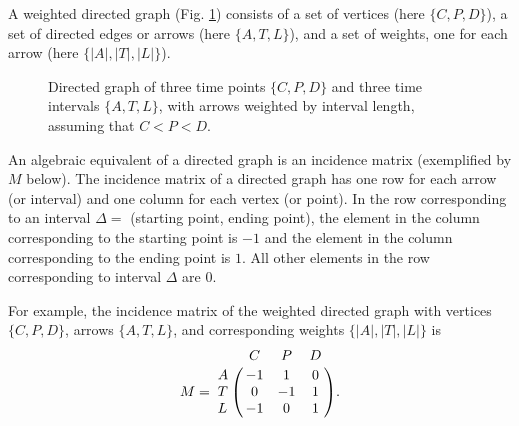 \documentclass{bmcart}
\begin{document}
A weighted directed graph (Fig. \ref{fig:digraph}) consists of a set of vertices (here $\{C,P,D\}$), 
a set of directed edges or arrows (here $\{A,T,L\}$), 
and a set of weights, one for each arrow (here $\{|A|,|T|,|L|\}$).


\begin{figure}[h!]
 \captionsetup{width=.8\linewidth}
\centering
{}
\caption{Directed graph of three time points $\{C,P,D\}$
and three time intervals $\{A,T,L\}$, with arrows
weighted by interval length, assuming that $C<P<D$.}
\label{fig:digraph}
\end{figure}

An algebraic equivalent of a directed graph is an incidence matrix
(exemplified by $M$ below).
The incidence matrix of a directed graph has one row for each arrow (or interval)
and one column for each vertex (or point).
In the row corresponding to an interval $\Delta =$ (starting point, ending point),
the element in the column corresponding to the starting point is $-1$ and
the element in the column corresponding to the ending point is $1$.
All other elements in the row corresponding to interval $\Delta$ are $0$.

For example, the incidence matrix of the weighted directed graph
with vertices $\{C,P,D\}$, 
arrows $\{A,T,L\}$, 
and corresponding weights $\{|A|,|T|,|L|\}$ is
\[
M = \bordermatrix{~ & C & P & D \cr
A & -1 & 1 & 0 \cr
T & 0 & -1 & 1 \cr
L & -1 & 0 & 1 \cr}
.\]
\end{document}
